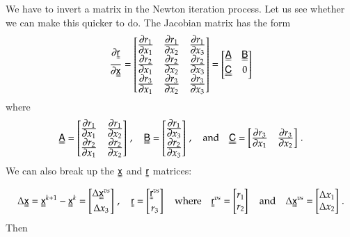 \documentclass[twoside,10pt,a4paper]{article}
\begin{document}
We have to invert a matrix in the Newton iteration process.  Let us see whether we can make this 
quicker to do.  The Jacobian matrix has the form
\[
  \Partial{\Mr}{\Mx} = \begin{bmatrix}\Partial{r_1}{x_1} & \Partial{r_1}{x_2} & \Partial{r_1}{x_3} \\
     \Partial{r_2}{x_1} & \Partial{r_2}{x_2} & \Partial{r_2}{x_3} \\
     \Partial{r_3}{x_1} & \Partial{r_3}{x_2} & \Partial{r_3}{x_3} \end{bmatrix} 
     = \begin{bmatrix} \MAmat & \MBmat \\ \MCmat & 0 \end{bmatrix}
\]
where
\[
  \MAmat = \begin{bmatrix}\Partial{r_1}{x_1} & \Partial{r_1}{x_2} \\
                       \Partial{r_2}{x_1} & \Partial{r_2}{x_2} \end{bmatrix} \,,\quad
  \MBmat = \begin{bmatrix}\Partial{r_1}{x_3} \\ \Partial{r_2}{x_3} \end{bmatrix} \,,\quad \Tand \quad
  \MCmat = \begin{bmatrix}\Partial{r_3}{x_1} & \Partial{r_3}{x_2} \end{bmatrix} \,.
\]
We can also break up the $\Mx$ and $\Mr$ matrices:
\[
  \Delta\Mx = \Mx^{k+1}-\Mx^k = \begin{bmatrix} \Delta\Mx^{vs} \\ \Delta x_3 \end{bmatrix} \,, \quad
  \Mr = \begin{bmatrix} \Mr^{vs} \\ r_3 \end{bmatrix}
  \quad \text{where} \quad \Mr^{vs} = \begin{bmatrix} r_1 \\ r_2 \end{bmatrix}  
   \quad \Tand \quad \Delta\Mx^{vs} = \begin{bmatrix}\Delta x_1 \\\Delta x_2 \end{bmatrix}  \,.
\]
Then
\end{document}
